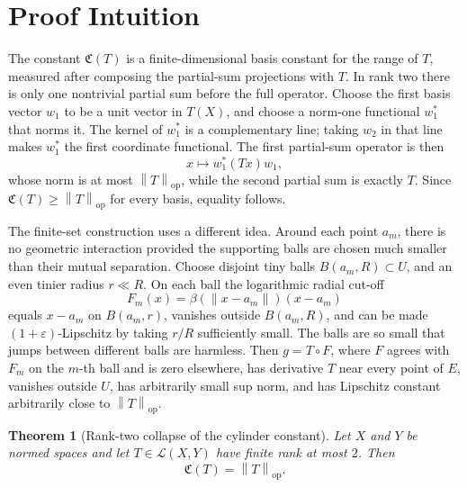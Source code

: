 \documentclass[11pt]{article}
\newtheorem{theorem}{Theorem}
\newcommand{\cyl}{\mathfrak C}
\newcommand{\opnorm}[1]{\left\|#1\right\|_{\mathrm{op}}}
\begin{document}
\section*{Proof Intuition}

The constant \(\cyl(T)\) is a finite-dimensional basis constant for the range
of \(T\), measured after composing the partial-sum projections with \(T\).  In
rank two there is only one nontrivial partial sum before the full operator.
Choose the first basis vector \(w_1\) to be a unit vector in \(T(X)\), and
choose a norm-one functional \(w_1^*\) that norms it.  The kernel of \(w_1^*\)
is a complementary line; taking \(w_2\) in that line makes \(w_1^*\) the first
coordinate functional.  The first partial-sum operator is then
\[
  x\mapsto w_1^*(Tx)w_1,
\]
whose norm is at most \(\opnorm{T}\), while the second partial sum is exactly
\(T\).  Since \(\cyl(T)\geq \opnorm{T}\) for every basis, equality follows.

The finite-set construction uses a different idea.  Around each point \(a_m\),
there is no geometric interaction provided the supporting balls are chosen much
smaller than their mutual separation.  Choose disjoint tiny balls
\(B(a_m,R)\subset U\), and an even tinier radius \(r\ll R\).  On each ball the
logarithmic radial cut-off
\[
  F_m(x)=\beta(\|x-a_m\|)(x-a_m)
\]
equals \(x-a_m\) on \(B(a_m,r)\), vanishes outside \(B(a_m,R)\), and can be
made \((1+\varepsilon)\)-Lipschitz by taking \(r/R\) sufficiently small.  The
balls are so small that jumps between different balls are harmless.  Then
\(g=T\circ F\), where \(F\) agrees with \(F_m\) on the \(m\)-th ball and is zero
elsewhere, has derivative \(T\) near every point of \(E\), vanishes outside
\(U\), has arbitrarily small sup norm, and has Lipschitz constant arbitrarily
close to \(\opnorm{T}\).

\begin{theorem}[Rank-two collapse of the cylinder constant]
Let \(X\) and \(Y\) be normed spaces and let \(T\in\mathcal L(X,Y)\) have
finite rank at most \(2\).  Then
\[
  \cyl(T)=\opnorm{T}.
\]
\end{theorem}
\end{document}
